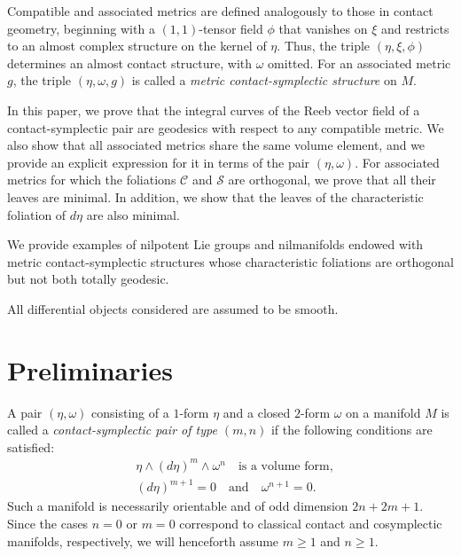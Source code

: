\documentclass[12pt]{amsart}
\theoremstyle{definition}
\theoremstyle{remark}
\begin{document}
\medskip 
\noindent
Compatible and associated metrics are defined analogously to those in contact geometry, beginning with a $(1,1)$-tensor field $\phi$ 
that vanishes on $\xi$ and  restricts to an almost complex structure on the kernel of $\eta$.
Thus, the triple $(\eta,  \xi, \phi)$ determines an almost contact structure, with  $\omega$ omitted. 
For an associated metric $g$, the triple $(\eta,\omega,g)$ is called a \emph{metric contact-symplectic structure} on $M$.

\medskip 
\noindent
In this paper, we prove that the integral curves of the Reeb vector field of a contact-symplectic pair are geodesics with respect to any compatible metric.
We also show that all associated metrics share the same volume element, and we provide an explicit expression for it in terms of the pair $(\eta,\omega)$.
For associated metrics for which  the foliations $\mathcal{C}$ and $\mathcal{S}$ are orthogonal, we prove that all their leaves are minimal. 
In addition, we show that the leaves of the characteristic foliation of $d\eta$ are also minimal. 

\medskip 
\noindent
We provide examples of nilpotent Lie groups and nilmanifolds endowed with  metric contact-symplectic structures whose characteristic foliations are orthogonal but not both totally geodesic.

\medskip 
\noindent
All differential objects considered are assumed to be smooth.



\section{Preliminaries}

A pair $(\eta , \omega)$ consisting of a $1$-form $\eta$ and a closed $2$-form $\omega$ on a manifold $M$ is called a \emph{contact-symplectic pair of type $(m,n)$} if the following conditions are satisfied:
\begin{align*}
&\eta\wedge (d\eta)^{m}\wedge\omega^{n} \quad \text{is a volume form},\\
&(d\eta)^{m+1}=0 \quad  \text{and} \quad \omega^{n+1}=0.
\end{align*}
Such a manifold is necessarily orientable and of odd dimension $2n+2m+1$.
Since the cases $n=0$ or $m=0$ correspond to classical contact and cosymplectic manifolds, respectively, we will henceforth assume $m\geq 1$ and $n\geq 1$.
\end{document}
